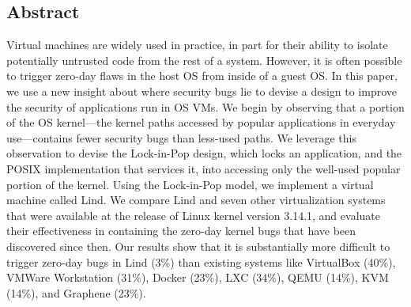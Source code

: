 \subsection*{Abstract}
Virtual machines are widely used in practice, in part for their ability to
isolate potentially untrusted code from the rest of a system.
However, it is often possible to trigger zero-day flaws
in the host OS from inside of a guest OS.  %
In this paper, we use a new insight about where security bugs lie to devise a design to improve the security of applications
run in OS VMs.
We begin by observing that a portion of the OS kernel—the kernel paths accessed
by popular applications in everyday use—contains fewer security bugs than less-used paths. We
leverage this observation to devise the Lock-in-Pop design, which
locks an application, and the POSIX implementation that services it, into
accessing only the well-used popular portion of the kernel.  Using the Lock-in-Pop model, we
implement a virtual machine called Lind.
We compare Lind and seven other virtualization systems that were
available at the release of Linux kernel version 3.14.1, and evaluate
their effectiveness in containing the zero-day kernel bugs that have been discovered
since then.
Our results show that it is substantially more difficult to trigger zero-day bugs in
Lind (3\%) than existing systems like VirtualBox (40\%), VMWare Workstation
(31\%), Docker (23\%), LXC (34\%), QEMU (14\%), KVM (14\%), and Graphene (23\%).
